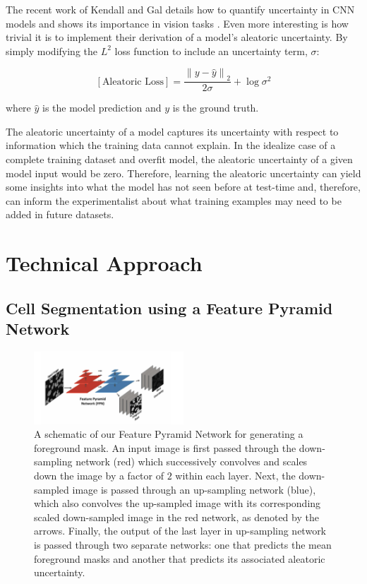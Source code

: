 \documentclass[10pt,twocolumn,letterpaper]{article}
\newcommand{\norm}[1]{\left\lVert#1\right\rVert}
\begin{document}
The recent work of Kendall and Gal details how to quantify uncertainty in CNN models and shows its importance in vision tasks \cite{bayes_uncer_2017}.
Even more interesting is how trivial it is to implement their derivation of a model's aleatoric uncertainty.
By simply modifying the $L^2$ loss function to include an uncertainty term, $\sigma$:

\begin{equation}\label{eq_uncer}
[\text{Aleatoric Loss}] = \frac{\norm{y - \hat{y}}_2}{2 \sigma} +  \log \sigma^2
\end{equation}

where $\hat{y}$ is the model prediction and $y$ is the ground truth.


The aleatoric uncertainty of a model captures its uncertainty with respect to information which the training data cannot explain.
In the idealize case of a complete training dataset and overfit model, the aleatoric uncertainty of a given model input would be zero.
Therefore, learning the aleatoric uncertainty can yield some insights into what the model has not seen before at test-time
and, therefore, can inform the experimentalist about what training examples may need to be added in future datasets.


\section{Technical Approach}
\subsection{Cell Segmentation using a Feature Pyramid Network}

\begin{figure}[!h]
\centering
\includegraphics[width=0.5\textwidth]{fpn}
\caption{A schematic of our Feature Pyramid Network for generating a foreground mask. An input image is first passed through the down-sampling network (red) which successively convolves and scales  down the image by a factor of $2$ within each layer. Next, the down-sampled image is passed through an up-sampling network (blue), which also convolves the up-sampled image with its corresponding scaled down-sampled image in the red network, as denoted by the arrows. Finally, the output of the last layer in up-sampling network
is passed through two separate networks: one that predicts the mean foreground masks and another that predicts its associated aleatoric uncertainty.}
\label{fig1}
\end{figure}
\end{document}
